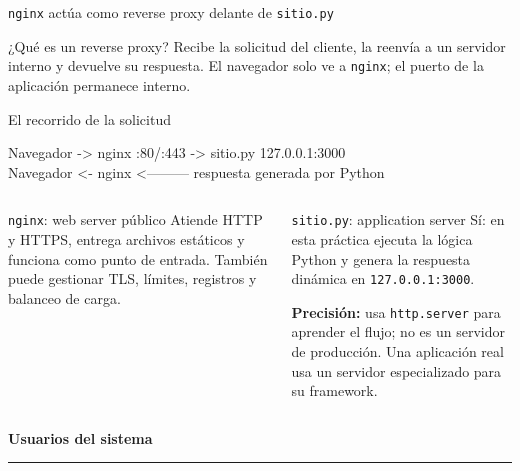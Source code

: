\documentclass[aspectratio=169,10pt,c]{beamer}
\begin{document}
\begin{frame}{\texttt{nginx} actúa como reverse proxy delante de \texttt{sitio.py}}
\begin{block}{¿Qué es un reverse proxy?}
\small Recibe la solicitud del cliente, la reenvía a un servidor interno y devuelve su respuesta. El navegador solo ve a \texttt{nginx}; el puerto de la aplicación permanece interno.
\end{block}
\begin{exampleblock}{El recorrido de la solicitud}
\begin{terminal}\footnotesize
Navegador -> nginx :80/:443 -> sitio.py 127.0.0.1:3000\\
Navegador <- nginx <--------- respuesta generada por Python
\end{terminal}
\end{exampleblock}
\begin{columns}[T,onlytextwidth]
\begin{block}{\texttt{nginx}: web server público}
\small Atiende HTTP y HTTPS, entrega archivos estáticos y funciona como punto de entrada. También puede gestionar TLS, límites, registros y balanceo de carga.
\end{block}
\begin{block}{\texttt{sitio.py}: application server}
\small Sí: en esta práctica ejecuta la lógica Python y genera la respuesta dinámica en \texttt{127.0.0.1:3000}.\par\smallskip
\footnotesize \textbf{Precisión:} usa \texttt{http.server} para aprender el flujo; no es un servidor de producción. Una aplicación real usa un servidor especializado para su framework.
\end{block}
\end{columns}
\end{frame}

\begin{frame}[plain]
\vfill
\begin{center}
{\fontsize{32}{38}\selectfont\bfseries Usuarios del sistema}\par
\vspace{4mm}
{\color{utpRojo}\rule{8.5cm}{1.2pt}}
\end{center}
\vfill
\end{frame}
\end{document}
